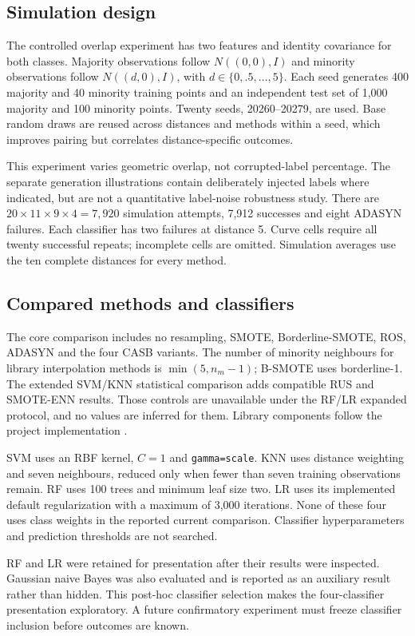 \documentclass[conference]{IEEEtran}
\begin{document}
\subsection{Simulation design}
The controlled overlap experiment has two features and identity covariance for both classes. Majority observations follow $N((0,0),I)$ and minority observations follow $N((d,0),I)$, with $d\in\{0,.5,\ldots,5\}$. Each seed generates 400 majority and 40 minority training points and an independent test set of 1,000 majority and 100 minority points. Twenty seeds, 20260--20279, are used. Base random draws are reused across distances and methods within a seed, which improves pairing but correlates distance-specific outcomes.

This experiment varies geometric overlap, not corrupted-label percentage. The separate generation illustrations contain deliberately injected labels where indicated, but are not a quantitative label-noise robustness study. There are $20\times11\times9\times4=7{,}920$ simulation attempts, 7,912 successes and eight ADASYN failures. Each classifier has two failures at distance 5. Curve cells require all twenty successful repeats; incomplete cells are omitted. Simulation averages use the ten complete distances for every method.

\subsection{Compared methods and classifiers}
The core comparison includes no resampling, SMOTE, Borderline-SMOTE, ROS, ADASYN and the four CASB variants. The number of minority neighbours for library interpolation methods is $\min(5,n_m-1)$; B-SMOTE uses borderline-1. The extended SVM/KNN statistical comparison adds compatible RUS and SMOTE-ENN results. Those controls are unavailable under the RF/LR expanded protocol, and no values are inferred for them. Library components follow the project implementation \citep{imblearn,sklearn}.

SVM uses an RBF kernel, $C=1$ and \texttt{gamma=scale}. KNN uses distance weighting and seven neighbours, reduced only when fewer than seven training observations remain. RF uses 100 trees and minimum leaf size two. LR uses its implemented default regularization with a maximum of 3,000 iterations. None of these four uses class weights in the reported current comparison. Classifier hyperparameters and prediction thresholds are not searched.

RF and LR were retained for presentation after their results were inspected. Gaussian naive Bayes was also evaluated and is reported as an auxiliary result rather than hidden. This post-hoc classifier selection makes the four-classifier presentation exploratory. A future confirmatory experiment must freeze classifier inclusion before outcomes are known.
\end{document}
